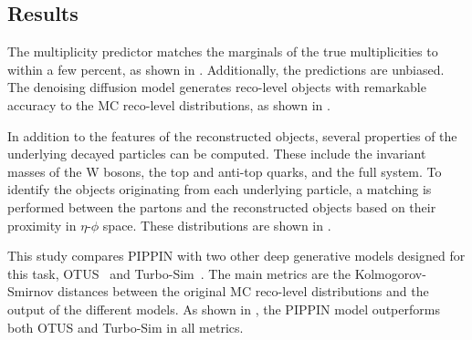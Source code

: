 \subsection{Results}

The multiplicity predictor matches the marginals of the true multiplicities to within a few percent, as shown in .
Additionally, the predictions are unbiased.
The denoising diffusion model generates reco-level objects with remarkable accuracy to the MC reco-level distributions, as shown in .

In addition to the features of the reconstructed objects, several properties of the underlying decayed particles can be computed.
These include the invariant masses of the W bosons, the top and anti-top quarks, and the full \ttbar system.
To identify the objects originating from each underlying particle, a matching is performed between the partons and the reconstructed objects based on their proximity in $\eta$-$\phi$ space.
These distributions are shown in .

This study compares PIPPIN with two other deep generative models designed for this task, OTUS~\cite{OTUS} and Turbo-Sim~\cite{TurboSim}.
The main metrics are the Kolmogorov-Smirnov distances between the original MC reco-level distributions and the output of the different models.
As shown in , the PIPPIN model outperforms both OTUS and Turbo-Sim in all metrics.

